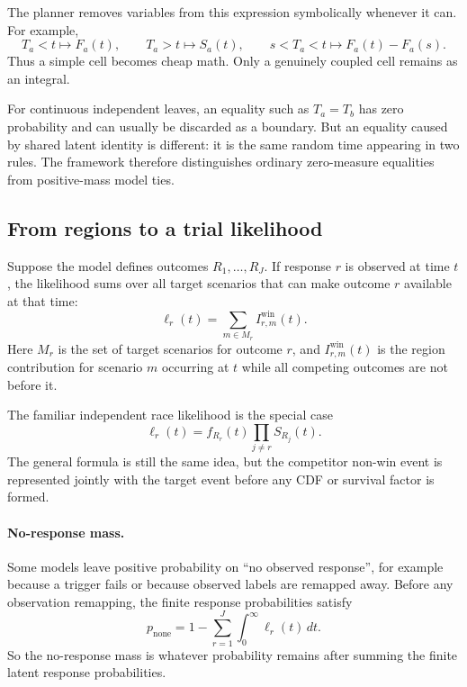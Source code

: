 \documentclass[11pt]{article}
\begin{document}
The planner removes variables from this expression symbolically whenever it can.
For example,
\[
T_a < t \mapsto F_a(t), \qquad
T_a > t \mapsto S_a(t), \qquad
s < T_a < t \mapsto F_a(t)-F_a(s).
\]
Thus a simple cell becomes cheap math. Only a genuinely coupled cell remains as
an integral.

For continuous independent leaves, an equality such as $T_a=T_b$ has zero
probability and can usually be discarded as a boundary. But an equality caused
by shared latent identity is different: it is the same random time appearing in
two rules. The framework therefore distinguishes ordinary zero-measure
equalities from positive-mass model ties.

\subsection{From regions to a trial likelihood}

Suppose the model defines outcomes $R_1,\dots,R_J$. If response $r$ is observed
at time $t$, the likelihood sums over all target scenarios that can make
outcome $r$ available at that time:
\begin{equation}
\ell_r(t)
=
\sum_{m \in M_r}
I_{r,m}^{\mathrm{win}}(t).
\label{eq:scenario-win}
\end{equation}
Here $M_r$ is the set of target scenarios for outcome $r$, and
$I_{r,m}^{\mathrm{win}}(t)$ is the region contribution for scenario $m$
occurring at $t$ while all competing outcomes are not before it.

The familiar independent race likelihood is the special case
\begin{equation}
\ell_r(t) = f_{R_r}(t)\prod_{j \ne r} S_{R_j}(t).
\label{eq:simple-race}
\end{equation}
The general formula is still the same idea, but the competitor non-win event is
represented jointly with the target event before any CDF or survival factor is
formed.

\paragraph{No-response mass.}
Some models leave positive probability on ``no observed response'', for example
because a trigger fails or because observed labels are remapped away. Before any
observation remapping, the finite response probabilities satisfy
\begin{equation}
p_{\mathrm{none}}
=
1 - \sum_{r=1}^J \int_0^\infty \ell_r(t)\,dt.
\label{eq:no-response}
\end{equation}
So the no-response mass is whatever probability remains after summing the
finite latent response probabilities.
\end{document}
